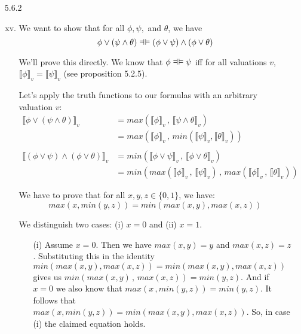 	\begin{enumerate}

      \item[5.6.2]

        \begin{enumerate}[(i)]
            \setcounter{enumii}{14}
          \item We want to show that for all $\phi, \psi,$ and $\theta$, we have
            \[\phi \vee (\psi \wedge \theta) \equi (\phi \vee \psi) \wedge (\phi \vee \theta)\]

            We'll prove this directly.
            We know that
            $\phi \equi \psi$
            iff for all valuations $v$,
            $\llbracket \phi \rrbracket_v = \llbracket\psi\rrbracket_v$
            (see proposition 5.2.5).

            Let's apply the truth functions to our formulas with an arbitrary valuation $v$:
           \begin{align*}
\llbracket \phi\vee (\psi\wedge\theta)\rrbracket_v &= max(\llbracket\phi\rrbracket_v \, , \, \llbracket \psi \wedge \theta \rrbracket_v ) \\
& = max(\llbracket\phi\rrbracket_v \, , \, min(\llbracket \psi \rrbracket_v, \llbracket \theta \rrbracket_v ))\\\\
\llbracket (\phi\vee\psi) \wedge (\phi \vee \theta)\rrbracket_v &= min(\llbracket\phi\vee\psi\rrbracket_v \, , \, \llbracket \phi \vee \theta \rrbracket_v ) \\
& = min(max(\llbracket\phi\rrbracket_v \, , \, \llbracket\psi\rrbracket_v) \, , \, max(\llbracket \phi \rrbracket_v\, , \, \llbracket \theta \rrbracket_v ))
           \end{align*}


            We have to prove that for all $x,y,z\in \{0,1\}$, we have:
            \[max(x, min(y,z)) = min(max(x,y),max(x,z))\]

            We distinguish two cases:
            (i) $x = 0$ and
            (ii) $x = 1$.
            \begin{itemize}
              \item[(i)] Assume $x=0$.
                Then we have
                $max(x,y) = y$
                and
                $max(x,z) = z$.
                Substituting this in the identity
                $min(max(x,y),max(x,z)) =min(max(x,y),max(x,z))$
                gives us
                $min(max(x,y) \, , \, max(x,z)) = min (y,z)$.
                And if $x=0$ we also know that
                $max(x \, , min(y,z)) = min(y,z)$.
                It follows that
                $max(x, min(y,z)) = min(max(x,y), max(x,z))$.
                So, in case (i) the claimed equation holds.


\end{itemize}
\end{enumerate}
\end{enumerate}
